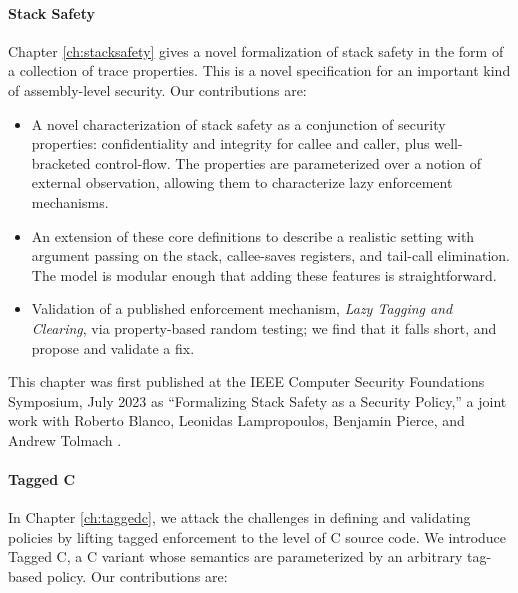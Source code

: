 \documentclass{report}
\begin{document}
\paragraph{Stack Safety}

Chapter \ref{ch:stacksafety} gives a novel formalization of stack safety in the
form of a collection of trace properties. This is a novel specification for an important
kind of assembly-level security. Our contributions are:

\begin{itemize}
  \item A novel characterization of stack safety as a conjunction
        of security properties: confidentiality and integrity for callee
        and caller, plus well-bracketed control-flow.
        The properties are parameterized over a notion of
        external observation, allowing them to characterize lazy enforcement
        mechanisms.
  \item An extension of these core definitions to
        describe a realistic setting with argument passing on the stack,
        callee-saves registers, and tail-call elimination. The model is
        modular enough that adding these features is straightforward.
  \item Validation of a published enforcement mechanism,
        \emph{Lazy Tagging and Clearing}, via property-based random testing; we find that
        it falls short, and propose and validate a fix.
\end{itemize}

This chapter was first published at the IEEE Computer Security Foundations Symposium,
July 2023 as ``Formalizing Stack Safety as a Security Policy,'' a
joint work with Roberto Blanco, Leonidas Lampropoulos, Benjamin Pierce, and Andrew Tolmach
\cite{Anderson23:StackSafety}.

\paragraph{Tagged C}

In Chapter \ref{ch:taggedc}, we attack the challenges in defining and validating policies
by lifting tagged enforcement to the level of C source code. We introduce Tagged C, a C variant
whose semantics are parameterized by an arbitrary tag-based policy. Our contributions are:
\end{document}
